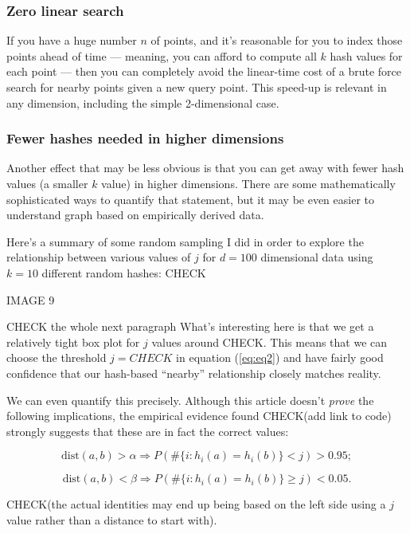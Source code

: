 \documentclass[20pt,]{extarticle}
\begin{document}
\subsubsection{Zero linear search}\label{zero-linear-search}

If you have a huge number \(n\) of points, and it's reasonable for you
to index those points ahead of time --- meaning, you can afford to
compute all \(k\) hash values for each point --- then you can completely
avoid the linear-time cost of a brute force search for nearby points
given a new query point. This speed-up is relevant in any dimension,
including the simple 2-dimensional case.

\subsubsection{Fewer hashes needed in higher
dimensions}\label{fewer-hashes-needed-in-higher-dimensions}

Another effect that may be less obvious is that you can get away with
fewer hash values (a smaller \(k\) value) in higher dimensions. There
are some mathematically sophisticated ways to quantify that statement,
but it may be even easier to understand graph based on empirically
derived data.

Here's a summary of some random sampling I did in order to explore the
relationship between various values of \(j\) for \(d=100\) dimensional
data using \(k=10\) different random hashes: CHECK

IMAGE 9

CHECK the whole next paragraph What's interesting here is that we get a
relatively tight box plot for \(j\) values around CHECK. This means that
we can choose the threshold \(j=CHECK\) in equation (\ref{eq:eq2}) and
have fairly good confidence that our hash-based ``nearby'' relationship
closely matches reality.

We can even quantify this precisely. Although this article doesn't
\emph{prove} the following implications, the empirical evidence found
CHECK(add link to code) strongly suggests that these are in fact the
correct values:

\[ \text{dist}(a, b) > \alpha \Rightarrow P(\#\{i : h_i(a) = h_i(b)\} < j) > 0.95; \]

\[ \text{dist}(a, b) < \beta  \Rightarrow P(\#\{i : h_i(a) = h_i(b)\} \ge j) < 0.05. \]

CHECK(the actual identities may end up being based on the left side
using a \(j\) value rather than a distance to start with).
\end{document}
